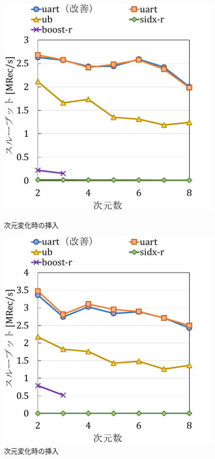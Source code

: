 \begin{figure}
  \begin{minipage}[c]{0.495\textwidth}
    \centering
    \includegraphics[scale=0.5]{./figures/graph-dimention-insert-0.pdf}
    \caption{次元変化時の挿入}
    \label{graph:}
  \end{minipage}
  \begin{minipage}[c]{0.495\textwidth}
    \centering
    \includegraphics[scale=0.5]{./figures/graph-dimention-insert-0.5.pdf}
    \caption{次元変化時の挿入}
    \label{graph:paired}
  \end{minipage}
\end{figure}


